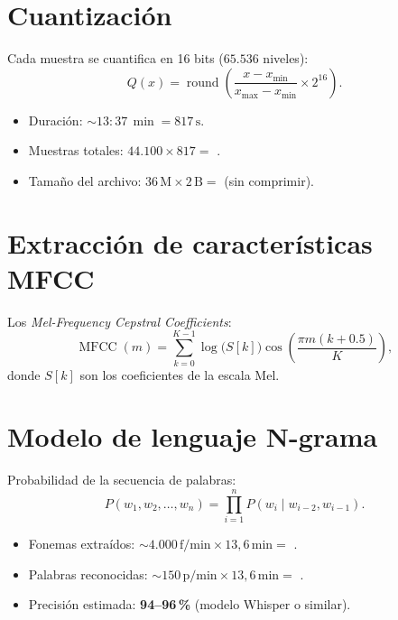 \documentclass{claudeeditorial}
\begin{document}
\section{Cuantización}

Cada muestra se cuantifica en 16 bits ($65.536$ niveles):
\[
  Q(x) = \operatorname{round}\!\left(\frac{x - x_{\min}}{x_{\max}-x_{\min}}\times 2^{16}\right).
\]

\begin{ClaudeTip}
\begin{itemize}[leftmargin=1.2em,nosep]
\item Duración: $\sim 13{:}37\,\min = 817\,\text{s}$.
\item Muestras totales: $44.100 \times 817 =$ .
\item Tamaño del archivo: $36\,\text{M}\times 2\,\text{B} =$  (sin comprimir).
\end{itemize}
\end{ClaudeTip}


\section{Extracción de características MFCC}

Los \emph{Mel-Frequency Cepstral Coefficients}:
\[
  \operatorname{MFCC}(m) = \sum_{k=0}^{K-1} \log\bigl(S[k]\bigr)\cos\!\left(\frac{\pi m(k+0.5)}{K}\right),
\]
donde $S[k]$ son los coeficientes de la escala Mel.

\section{Modelo de lenguaje N-grama}

Probabilidad de la secuencia de palabras:
\[
  P(w_1,w_2,\ldots,w_n) = \prod_{i=1}^{n} P(w_i\mid w_{i-2},w_{i-1}).
\]

\begin{ClaudeInfo}
\begin{itemize}[leftmargin=1.2em,nosep]
\item Fonemas extraídos: $\sim 4.000\,\text{f/min}\times 13{,}6\,\text{min} =$ .
\item Palabras reconocidas: $\sim 150\,\text{p/min}\times 13{,}6\,\text{min} =$ .
\item Precisión estimada: \textbf{\textcolor{claudeTerracotta}{94--96\,\%}} (modelo Whisper o similar).
\end{itemize}
\end{ClaudeInfo}
\end{document}
